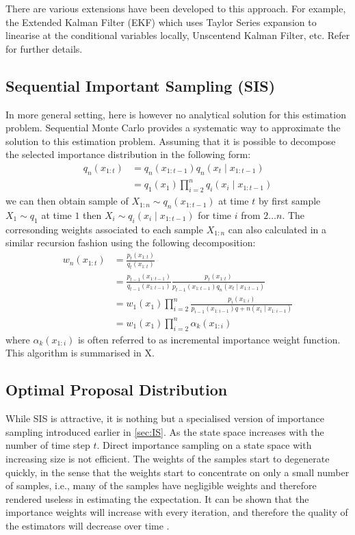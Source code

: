 There are various extensions have been developed to this approach. For example, the Extended Kalman Filter (EKF) which uses Taylor Series expansion to linearise at the conditional variables locally, Unscentend Kalman Filter, etc. Refer \cite{WG95} for further details.

\subsection{Sequential Important Sampling (SIS)}
In more general setting, here is however no analytical solution for this estimation problem. Sequential Monte Carlo provides a systematic way to approximate the solution to this estimation problem. Assuming that it is possible to decompose the selected importance distribution in the following form:
\begin{align}
	q_n(x_{1:t}) &= q_n(x_{1:t-1}) q_n(x_t \mid x_{1:t-1}) \nonumber \\
	             &= q_1(x_1) \prod^n_{i=2} q_i(x_i \mid x_{1:t-1})
\end{align}
we can then obtain sample of ${X_{1:n}} \sim q_n(x_{1:t-1})$ at time $t$ by first sample $X_1 \sim q_1$ at time $1$ then $X_i \sim q_i(x_i \mid x_{1:t-1})$ for time $i$ from $2 \ldots n$. The corresonding weights associated to each sample $X_{1:n}$ can also calculated in a similar recursion fashion using the following decomposition:
\begin{align}
  w_n(x_{1:t}) &= \frac{p_t(x_{1:t})}{q_t(x_{1:t})} \nonumber \\
               &= \frac{p_{t-1}(x_{1:t-1})}{q_{t-1}(x_{1:t-1})} \frac{p_t(x_{1:t})}{p_{t-1}(x_{1:t-1})q_n(x_t \mid x_{1:t-1})} \label{eq:w} \\
  &= w_1(x_1) \prod^n_{i=2} \frac{p_i(x_{1:i})}{p_{i-1}(x_{1:i-1})q+n(x_i \mid x_{1:i-1})} \nonumber \\
  &= w_1(x_1) \prod^n_{i=2} \alpha_k(x_{1:i})
\end{align}
where $\alpha_k(x_{1:i})$  is often referred to as incremental importance weight function. This algorithm is summarised in X.

\subsection{Optimal Proposal Distribution}
While SIS is attractive, it is nothing but a specialised version of importance sampling introduced earlier in \ref{sec:IS}. As the state space increases with the number of time step $t$. Direct importance sampling on a state space with increasing size is not efficient. The weights of the samples start to degenerate quickly, in the sense that the weights start to concentrate on only a small number of samples, i.e., many of the samples have negligible weights and therefore rendered useless in estimating the expectation. It can be shown that the importance weights will increase with every iteration, and therefore the quality of the estimators will decrease over time \cite{}. 

